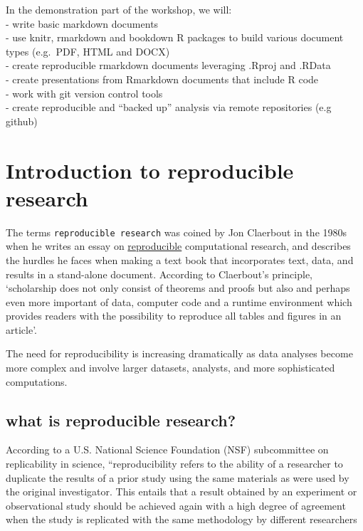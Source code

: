 \documentclass[
]{book}
\begin{document}
In the demonstration part of the workshop, we will:\\
- write basic markdown documents\\
- use knitr, rmarkdown and bookdown R packages to build various document types (e.g.~PDF, HTML and DOCX)\\
- create reproducible rmarkdown documents leveraging .Rproj and .RData\\
- create presentations from Rmarkdown documents that include R code\\
- work with git version control tools\\
- create reproducible and ``backed up'' analysis via remote repositories (e.g github)

\hypertarget{introduction-to-reproducible-research}{%
\chapter{Introduction to reproducible research}\label{introduction-to-reproducible-research}}

The terms \texttt{reproducible\ research} was coined by Jon Claerbout in the 1980s when he writes an essay on \href{http://sepwww.stanford.edu/sep/jon/reproducible.html}{reproducible} computational research, and describes the hurdles he faces when making a text book that incorporates text, data, and results in a stand-alone document. According to Claerbout's principle, `scholarship does not only consist of theorems and proofs but also and perhaps even more important of data, computer code and a runtime environment which provides readers with the possibility to reproduce all tables and figures in an article'.

The need for reproducibility is increasing dramatically as data analyses become more complex and involve larger datasets, analysts, and more sophisticated computations.

\hypertarget{what-is-reproducible-research}{%
\section{what is reproducible research?}\label{what-is-reproducible-research}}

According to a U.S. National Science Foundation (NSF) subcommittee on replicability in science, ``reproducibility refers to the ability of a researcher to duplicate the results of a prior study using the same materials as were used by the original investigator. This entails that a result obtained by an experiment or observational study should be achieved again with a high degree of agreement when the study is replicated with the same methodology by different researchers
\end{document}
